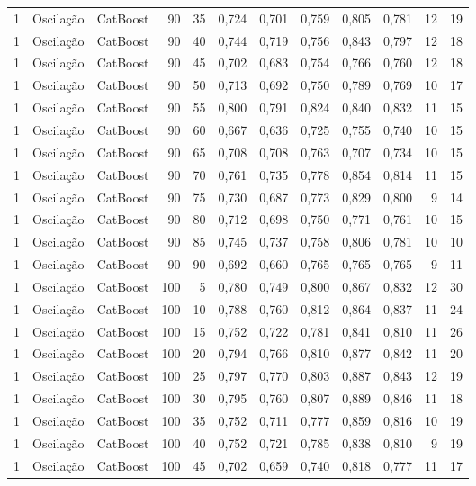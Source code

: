 \begin{longtable}{@{}rllrrrrrrrrr@{}}
1 & Oscilação & CatBoost & 90 & 35 & 0,724 & 0,701 & 0,759 & 0,805 & 0,781 & 12 & 19 \\
1 & Oscilação & CatBoost & 90 & 40 & 0,744 & 0,719 & 0,756 & 0,843 & 0,797 & 12 & 18 \\
1 & Oscilação & CatBoost & 90 & 45 & 0,702 & 0,683 & 0,754 & 0,766 & 0,760 & 12 & 18 \\
1 & Oscilação & CatBoost & 90 & 50 & 0,713 & 0,692 & 0,750 & 0,789 & 0,769 & 10 & 17 \\
1 & Oscilação & CatBoost & 90 & 55 & 0,800 & 0,791 & 0,824 & 0,840 & 0,832 & 11 & 15 \\
1 & Oscilação & CatBoost & 90 & 60 & 0,667 & 0,636 & 0,725 & 0,755 & 0,740 & 10 & 15 \\
1 & Oscilação & CatBoost & 90 & 65 & 0,708 & 0,708 & 0,763 & 0,707 & 0,734 & 10 & 15 \\
1 & Oscilação & CatBoost & 90 & 70 & 0,761 & 0,735 & 0,778 & 0,854 & 0,814 & 11 & 15 \\
1 & Oscilação & CatBoost & 90 & 75 & 0,730 & 0,687 & 0,773 & 0,829 & 0,800 & 9 & 14 \\
1 & Oscilação & CatBoost & 90 & 80 & 0,712 & 0,698 & 0,750 & 0,771 & 0,761 & 10 & 15 \\
1 & Oscilação & CatBoost & 90 & 85 & 0,745 & 0,737 & 0,758 & 0,806 & 0,781 & 10 & 10 \\
1 & Oscilação & CatBoost & 90 & 90 & 0,692 & 0,660 & 0,765 & 0,765 & 0,765 & 9 & 11 \\
1 & Oscilação & CatBoost & 100 & 5 & 0,780 & 0,749 & 0,800 & 0,867 & 0,832 & 12 & 30 \\
1 & Oscilação & CatBoost & 100 & 10 & 0,788 & 0,760 & 0,812 & 0,864 & 0,837 & 11 & 24 \\
1 & Oscilação & CatBoost & 100 & 15 & 0,752 & 0,722 & 0,781 & 0,841 & 0,810 & 11 & 26 \\
1 & Oscilação & CatBoost & 100 & 20 & 0,794 & 0,766 & 0,810 & 0,877 & 0,842 & 11 & 20 \\
1 & Oscilação & CatBoost & 100 & 25 & 0,797 & 0,770 & 0,803 & 0,887 & 0,843 & 12 & 19 \\
1 & Oscilação & CatBoost & 100 & 30 & 0,795 & 0,760 & 0,807 & 0,889 & 0,846 & 11 & 18 \\
1 & Oscilação & CatBoost & 100 & 35 & 0,752 & 0,711 & 0,777 & 0,859 & 0,816 & 10 & 19 \\
1 & Oscilação & CatBoost & 100 & 40 & 0,752 & 0,721 & 0,785 & 0,838 & 0,810 & 9 & 19 \\
1 & Oscilação & CatBoost & 100 & 45 & 0,702 & 0,659 & 0,740 & 0,818 & 0,777 & 11 & 17 \\

\end{longtable}
